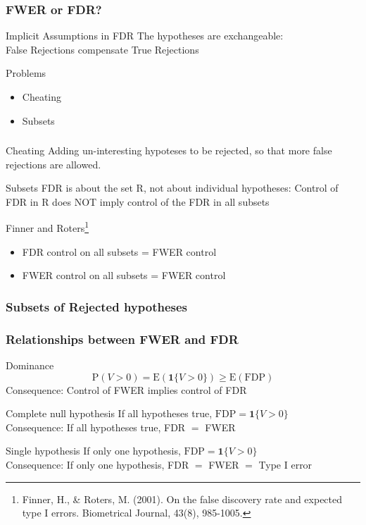 \documentclass[xcolor={dvipsnames}]{beamer}
\newcommand{\bb}[1]{\begin{block}{#1}}
\newcommand{\eb}{\end{block}}
\newcommand{\bi}{\begin {itemize}}
\newcommand{\ei}{\end{itemize}}
\newcommand{\bfr}[1]{\begin{frame} \frametitle{#1}}
\begin{document}
\bfr{FWER or FDR?}
  \bb{Implicit Assumptions in FDR}
    The hypotheses are exchangeable:
    \\ False Rejections compensate True Rejections
  \eb
  \pause
  \bb{Problems}
    \bi
     \item Cheating 
     \item Subsets
    \ei
  \eb
\end{frame}

\bfr{}
\bb{Cheating}
Adding un-interesting hypoteses to be rejected, so that more false rejections are allowed.
\eb
\pause
\bb{Subsets}
FDR is about the set R, not about individual hypotheses:
Control of FDR in R does NOT imply control of the FDR in all subsets\\
\eb
\bb{Finner and Roters\footnote{Finner, H., \& Roters, M. (2001). On the false discovery rate and expected type I errors. Biometrical Journal, 43(8), 985-1005.}}
    \bi
      \item FDR control on all subsets = FWER control
      \item FWER control on all subsets = FWER control
    \ei
\eb
\end{frame}

\bfr{Subsets of Rejected hypotheses}
\end{frame}




\bfr{Relationships between FWER and FDR}
  \bb{Dominance}
    \[ \mathrm{P}(V > 0) = \mathrm{E}(\boldsymbol{1}\{V > 0\}) \geq \mathrm{E}(\mathrm{FDP}) \]
    Consequence: Control of FWER implies control of FDR
  \eb
  \bb{Complete null hypothesis}
    If all hypotheses true, $\mathrm{FDP} = \boldsymbol{1}\{V > 0\}$
    \\ Consequence: If all hypotheses true, FDR $=$ FWER
  \eb
  \bb{Single hypothesis}
    If only one hypothesis, $\mathrm{FDP} = \boldsymbol{1}\{V > 0\}$
    \\ Consequence: If only one hypothesis, FDR $=$ FWER $=$ Type I error
  \eb
\end{frame}
\end{document}
